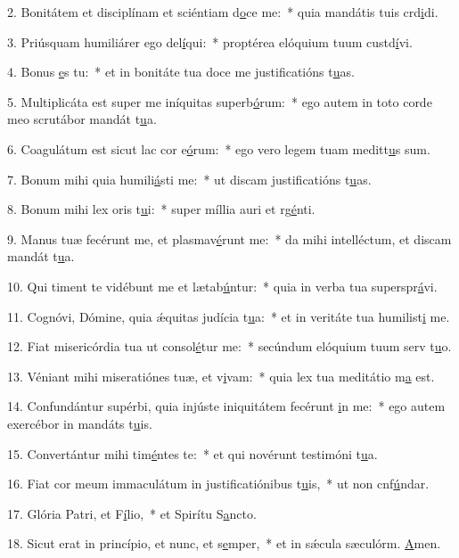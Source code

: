 2. Bonitátem et disciplínam et sciéntiam d\uline{o}ce me:~* quia mandátis tuis crd\uline{i}di.\par 
3. Priúsquam humiliárer ego del\uline{í}qui:~* proptérea elóquium tuum custd\uline{í}vi.\par 
4. Bonus \uline{e}s tu:~* et in bonitáte tua doce me justificatións t\uline{u}as.\par 
5. Multiplicáta est super me iníquitas superb\uline{ó}rum:~* ego autem in toto corde meo scrutábor mandát t\uline{u}a.\par 
6. Coagulátum est sicut lac cor e\uline{ó}rum:~* ego vero legem tuam meditt\uline{u}s sum.\par 
7. Bonum mihi quia humili\uline{á}sti me:~* ut discam justificatións t\uline{u}as.\par 
8. Bonum mihi lex oris t\uline{u}i:~* super míllia auri et rg\uline{é}nti.\par 
9. Manus tuæ fecérunt me, et plasmav\uline{é}runt me:~* da mihi intelléctum, et discam mandát t\uline{u}a.\par 
10. Qui timent te vidébunt me et lætab\uline{ú}ntur:~* quia in verba tua superspr\uline{á}vi.\par 
11. Cognóvi, Dómine, quia ǽquitas judícia t\uline{u}a:~* et in veritáte tua humilist\uline{i} me.\par 
12. Fiat misericórdia tua ut consol\uline{é}tur me:~* secúndum elóquium tuum serv t\uline{u}o.\par 
13. Véniant mihi miseratiónes tuæ, et v\uline{i}vam:~* quia lex tua meditátio m\uline{a} est.\par 
14. Confundántur supérbi, quia injúste iniquitátem fecérunt \uline{i}n me:~* ego autem exercébor in mandáts t\uline{u}is.\par 
15. Convertántur mihi tim\uline{é}ntes te:~* et qui novérunt testimóni t\uline{u}a.\par 
16. Fiat cor meum immaculátum in justificatiónibus t\uline{u}is,~* ut non cnf\uline{ú}ndar.\par 
17. Glória Patri, et F\uline{í}lio,~* et Spirítu S\uline{a}ncto.\par 
18. Sicut erat in princípio, et nunc, et s\uline{e}mper,~* et in sǽcula sæculórm. \uline{A}men.\par 
